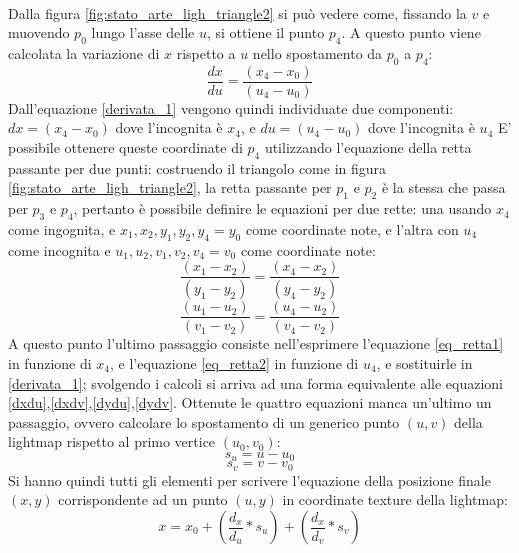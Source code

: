 \\
Dalla figura \ref{fig:stato_arte_ligh_triangle2} si può vedere come, fissando la $v$ e muovendo $p_0$ lungo l’asse delle $u$, si ottiene il punto $p_4$. A questo punto viene calcolata la variazione di $x$ rispetto a $u$ nello spostamento da $p_0$ a $p_4$:
\begin{equation}
\frac{dx}{du} = \frac{(x_4 - x_0)}{(u_4 - u_0)} 
\label{derivata_1}
\end{equation}
Dall'equazione \ref{derivata_1} vengono quindi individuate due componenti: $dx = (x_4-x_0)$ dove l’incognita è $x_4$, e $du = (u_4-u_0)$ dove l’incognita è $u_4$ E’ possibile ottenere queste coordinate di $p_4$ utilizzando l’equazione della retta passante per due punti: costruendo il triangolo come in figura \ref{fig:stato_arte_ligh_triangle2}, la retta passante per $p_1$ e $p_2$ è la stessa che passa per $p_3$ e $p_4$, pertanto è possibile definire le equazioni per due rette: una usando $x_4$ come ingognita, e $x_1,x_2,y_1,y_2,y_4=y_0$ come coordinate note, e l’altra con $u_4$ come incognita e $u_1,u_2,v_1,v_2,v_4=v_0$ come coordinate note:
\begin{equation}
\frac{(x_1 - x_2)}{(y_1 - y_2)} = \frac{(x_4 - x_2)}{(y_4 - y_2)} 
\label{eq_retta1}
\end{equation}
\begin{equation}
\frac{(u_1 - u_2)}{(v_1 - v_2)} = \frac{(u_4 - u_2)}{(v_4 - v_2)} 
\label{eq_retta2}
\end{equation}
A questo punto l’ultimo passaggio consiste nell'esprimere l'equazione \ref{eq_retta1} in funzione di $x_4$, e l'equazione \ref{eq_retta2} in funzione di $u_4$, e sostituirle in \ref{derivata_1}; svolgendo i calcoli si arriva ad una forma equivalente alle equazioni \ref{dxdu},\ref{dxdv},\ref{dydu},\ref{dydv}.
Ottenute le quattro equazioni manca un’ultimo un passaggio, ovvero calcolare lo spostamento di un generico punto $(u,v)$ della lightmap rispetto al primo vertice $(u_0,v_0)$:
\begin{equation}
s_u = u - u_0
\end{equation}
\begin{equation}
s_v = v - v_0
\end{equation}
Si hanno quindi tutti gli elementi per scrivere l’equazione della posizione finale $(x,y)$ corrispondente ad un punto $(u,y)$ in coordinate texture della lightmap:
\begin{equation}
x = x_0 + (\frac{d_x}{d_u} * s_u) + (\frac{d_x}{d_v} * s_v)
\label{eq_fin1}
\end{equation}

